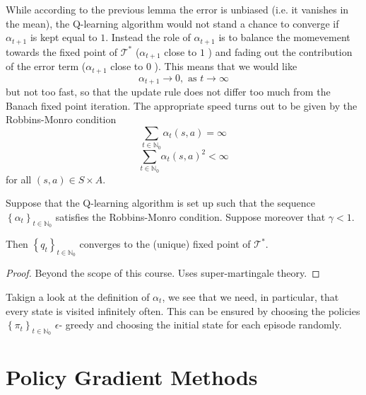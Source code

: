 While according to the previous lemma the error is unbiased (i.e. it vanishes in the mean), the Q-learning algorithm would not stand a chance to converge if \( \alpha_{t+1} \) is kept equal to \( 1 \).
Instead the role of \( \alpha_{t+1} \) is to balance the momevement towards the fixed point of \( \mathcal{T}^* \) (\( \alpha_{t+1} \) close to \( 1 \)  ) and fading out the contribution of the error term (\( \alpha_{t+1} \) close to \( 0 \)  ). This means that we would like 
\[
    \alpha_{t+1} \to 0, \text{ as } t \to \infty
\]
but not too fast, so that the update rule does not differ too much from the Banach fixed point iteration. The appropriate speed turns out to be given by the Robbins-Monro condition 
\[
    \sum_{t \in \mathbb{N}_{0}} \alpha_t (s,a) = \infty
\]
\[
     \sum_{t \in \mathbb{N}_{0}} \alpha_t (s,a)^2 < \infty
\]
for all \( (s,a) \in S \times A \).




\begin{theorem}
Suppose that the Q-learning algorithm is set up such that the sequence \( \left\{  \alpha_t \right\}_{t \in \mathbb{N}_{0}} \) satisfies the Robbins-Monro condition. Suppose moreover that \( \gamma < 1 \).

Then \( \left\{ q_t \right\}_{t \in \mathbb{N}_{0}} \) converges to the (unique) fixed point of \( \mathcal{T}^* \).
\end{theorem}

\begin{proof}Beyond the scope of this course. Uses super-martingale theory.
\end{proof}



Takign a look at the definition of \( \alpha_t \), we see that we need, in particular, that every state is visited infinitely often. This can be ensured by choosing the policies \( \left\{ \pi_t \right\}_{t \in \mathbb{N}_{0}}\) \( \epsilon \)- greedy and choosing the initial state for each episode randomly.



















\section{Policy Gradient Methods}


